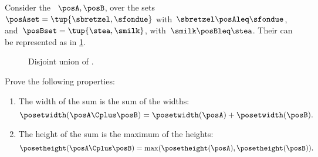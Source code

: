 \begin{example}
    Consider the ~$\posA,\posB$, over the sets~$\posAset=\tup{\sbretzel, \sfondue}$ with~$\sbretzel \posAleq \sfondue$, and~$\posBset=\tup{\stea,\smilk}$, with~$\smilk \posBleq \stea$.
    Their  can be represented as in \cref{fig:poset-coproduct}.
    \begin{figure}[h!]
        \centering
        \caption{Disjoint union of .}
        \label{fig:poset-coproduct}
    \end{figure}
\end{example}
\vfill
\begin{gradedexercise}
    \label{ex:MeasurePosetSum}
    Prove the following properties:
    \begin{enumerate}
        \item The width of the sum is the sum of the widths:
              \begin{equation}\label{eq:MeasurePosetSum-1}
                  \posetwidth(\posA \Cplus \posB) = \posetwidth(\posA) + \posetwidth(\posB).
              \end{equation}
        \item The height of the sum is the maximum of the heights:
              \begin{equation}\label{eq:MeasurePosetSum-2}
                  \posetheight(\posA \Cplus \posB) = \max(\posetheight(\posA), \posetheight(\posB)).
              \end{equation}
    \end{enumerate}
\end{gradedexercise}
